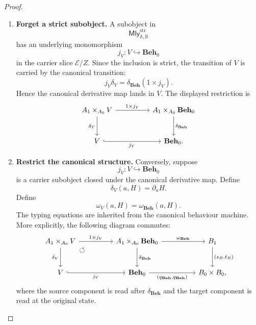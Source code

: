 \begin{proof}
    \leavevmode
    \begin{enumerate}
        \item \textbf{Forget a strict subobject.}
        A subobject in
        \[
            \mathsf{Mly}^{\mathrm{str}}_{\mathbb A,\mathbb B}
        \]
        has an underlying monomorphism
        \[
            j_V:V\hookrightarrow\mathbf{Beh}_0
        \]
        in the carrier slice \(\mathcal E/Z\). Since the inclusion is strict,
        the transition of \(V\) is carried by the canonical transition:
        \[
            j_V\delta_V
            =
            \delta_{\mathbf{Beh}}(1\times j_V).
        \]
        Hence the canonical derivative map lands in \(V\). The displayed
        restriction is
        \[
        \begin{tikzcd}[column sep=huge, row sep=large]
            A_1\times_{A_0}V
                \arrow[r, "{1\times j_V}"]
                \arrow[d, "\delta_V"']
            &
            A_1\times_{A_0}\mathbf{Beh}_0
                \arrow[d, "\delta_{\mathbf{Beh}}"]
            \\
            V
                \arrow[r, hook, "j_V"']
            &
            \mathbf{Beh}_0 .
        \end{tikzcd}
        \]

        \item \textbf{Restrict the canonical structure.}
        Conversely, suppose
        \[
            j_V:V\hookrightarrow\mathbf{Beh}_0
        \]
        is a carrier subobject closed under the canonical derivative map. Define
        \[
            \delta_V(a,H)=\partial_aH.
        \]
        Define
        \[
            \omega_V(a,H)=\omega_{\mathbf{Beh}}(a,H).
        \]
        The typing equations are inherited from the canonical behaviour
        machine. More explicitly, the following diagram commutes:
        \[
        \begin{tikzcd}[column sep=huge, row sep=large]
            A_1\times_{A_0}V
                \arrow[r, "{1\times j_V}"]
                \arrow[d, "\delta_V"']
                \arrow[dr, phantom, "\circlearrowleft", very near start]
            &
            A_1\times_{A_0}\mathbf{Beh}_0
                \arrow[r, "\omega_{\mathbf{Beh}}"]
                \arrow[d, "\delta_{\mathbf{Beh}}"]
            &
            B_1
                \arrow[d, "{(s_B,t_B)}"]
            \\
            V
                \arrow[r, hook, "j_V"']
            &
            \mathbf{Beh}_0
                \arrow[r, "{(q_{\mathbf{Beh}},q_{\mathbf{Beh}})}"']
            &
            B_0\times B_0 ,
        \end{tikzcd}
        \]
        where the source component is read after \(\delta_{\mathbf{Beh}}\) and
        the target component is read at the original state.


\end{enumerate}
\end{proof}

